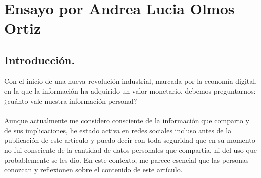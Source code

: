 \section*{Ensayo por Andrea Lucia Olmos Ortiz}
\subsection*{Introducción.}
Con el inicio de una nueva revolución industrial, marcada por la economía digital, en la que la información ha adquirido un valor monetario, debemos preguntarnos: ¿cuánto vale nuestra información personal?\\ \\
Aunque actualmente me considero consciente de la información que comparto y de sus implicaciones, he estado activa en redes sociales incluso antes de la publicación de este artículo y puedo decir con toda seguridad que en su momento no fui consciente de la cantidad de datos personales que compartía, ni del uso que probablemente se les dio. En este contexto, me parece esencial que las personas conozcan y reflexionen sobre el contenido de este artículo.
